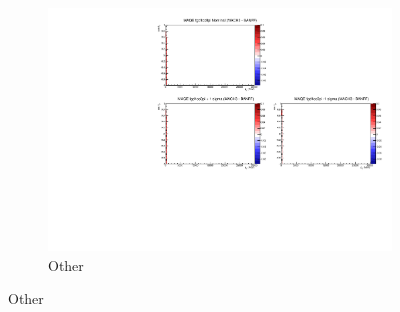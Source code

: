 \begin{figure}[h]
\begin{subfigure}[t]{0.32\textwidth}
		\includegraphics[width=\textwidth, trim={5mm 70mm 100mm 7mm}, clip, page=10]{figures/mach3/banff/momentumProjections_170328_withMACH3_MAQEonly}
		\caption{Other}
	\end{subfigure}
	

\end{figure}

